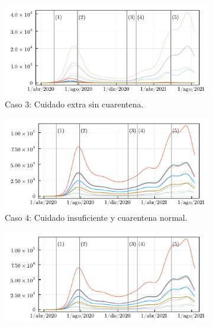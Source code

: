 \begin{figure}
     \centering
     \begin{subfigure}[b]{.47\textwidth}
         \centering
         \includegraphics[width=\textwidth]{img/resultados/comparecase_3withnormal_I_gamma_e_0-1724_gamma_i_0-0833_beta_2_2-0000.pdf}
         \caption{Caso \(3\): Cuidado extra sin cuarentena.}
         \label{img:esc-beta-chico-c3}
     \end{subfigure}
     \hfill
     \begin{subfigure}[b]{.47\textwidth}
         \centering
         \includegraphics[width=\textwidth]{img/resultados/comparecase_4withnormal_I_gamma_e_0-1724_gamma_i_0-0833_beta_2_2-0000.pdf}
         \caption{Caso \(4\): Cuidado insuficiente y cuarentena normal.}
         \label{img:esc-beta-chico-c4}
     \end{subfigure}
     \hfill
     \begin{subfigure}[b]{.47\textwidth}
         \centering
         \includegraphics[width=\textwidth]{img/resultados/comparecase_7withnormal_I_gamma_e_0-1724_gamma_i_0-0833_beta_2_2-0000.pdf}

\end{subfigure}
\end{figure}
